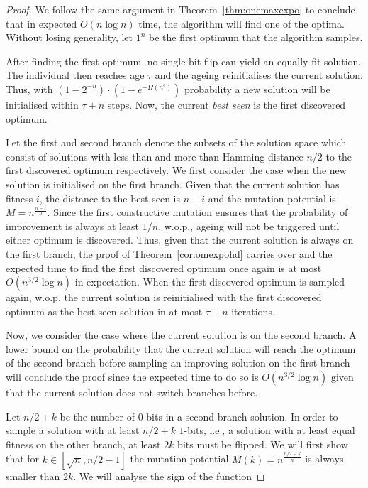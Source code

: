 \documentclass[lettersize,journal]{IEEEtran}
\begin{document}
\begin{proof}
	We follow the same argument in Theorem~\ref{thm:onemaxexpo} to conclude that in expected $O(n\log n)$ time, the algorithm will find one of the optima. {\color{blue} Without losing generality, let $1^n$ be the first optimum that the algorithm samples}. 
	
	After finding the first optimum, no single-bit flip can yield an equally fit solution. The individual then reaches age $\tau $ and the ageing reinitialises the current solution. Thus, with 
	$\left(1-2^{-n}\right) \cdot \left(1-e^{-\Omega(n^\epsilon)} \right)$ probability a new solution will be initialised within $\tau + n$ steps. Now, the current \emph{best seen} is the first discovered optimum. 
	
	Let the first and second branch denote the subsets of the solution space which consist of solutions with less than and more than Hamming distance $n/2$ to the first discovered optimum respectively. We first consider the case when the new solution is initialised on the first branch. Given that the current solution has fitness $i$, the distance to the best seen is $n-i$ and the mutation potential is $M=n^{\frac{n-i}{n}}$. Since the first constructive mutation ensures that the probability of improvement is always at least $1/n$, w.o.p.,  ageing will not be triggered until either optimum is discovered. Thus, given that the current solution is always on the first branch, the proof of Theorem~\ref{cor:omexpohd} carries over and the expected time to find the first discovered optimum once again is at most $O(n^{3/2}\log{n})$ in expectation. When the first discovered optimum is sampled again, w.o.p. the current solution is reinitialised with the first discovered optimum as the best seen solution in at most $\tau + n$ iterations.
	
	Now, we consider the case where the current solution is on the second branch. A lower 
	bound on the probability that the current solution will reach the optimum of the second branch before 
	sampling an improving solution on the first branch will conclude the proof since the expected time to do so is $O(n^{3/2}\log{n})$ given that the current solution does not switch branches before. 
	
	{\color{blue}Let $n/2 + k$ be the number of $0$-bits in a second branch solution. In order to sample a solution with at least $n/2 +k$ $1$-bits, i.e., a solution with at least equal fitness on the other branch, at least $2k$ bits must be flipped. We will first show that for $k \in [ \sqrt{n},n/2-1]$ the mutation potential $M(k)=n^\frac{n/2 -k}{n}$ is always smaller than $2k$. We will analyse the sign of the function 
	
}
\end{proof}
\end{document}
